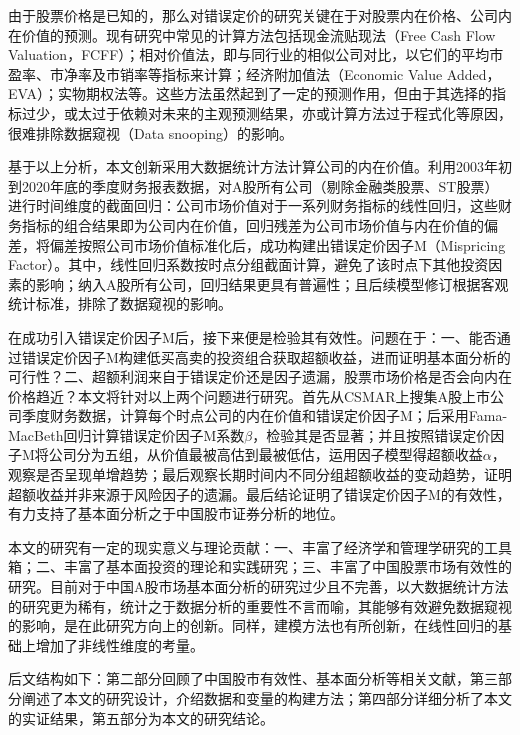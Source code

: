 由于股票价格是已知的，那么对错误定价的研究关键在于对股票内在价格、公司内在价值的预测。现有研究中常见的计算方法包括现金流贴现法（Free Cash Flow Valuation，FCFF）；相对价值法，即与同行业的相似公司对比，以它们的平均市盈率、市净率及市销率等指标来计算；经济附加值法（Economic Value Added，EVA）；实物期权法等。这些方法虽然起到了一定的预测作用，但由于其选择的指标过少，或太过于依赖对未来的主观预测结果，亦或计算方法过于程式化等原因，很难排除数据窥视（Data snooping）的影响。

基于以上分析，本文创新采用大数据统计方法计算公司的内在价值。利用2003年初到2020年底的季度财务报表数据，对A股所有公司（剔除金融类股票、ST股票）进行时间维度的截面回归：公司市场价值对于一系列财务指标的线性回归，这些财务指标的组合结果即为公司内在价值，回归残差为公司市场价值与内在价值的偏差，将偏差按照公司市场价值标准化后，成功构建出错误定价因子M（Mispricing Factor）。其中，线性回归系数按时点分组截面计算，避免了该时点下其他投资因素的影响；纳入A股所有公司，回归结果更具有普遍性；且后续模型修订根据客观统计标准，排除了数据窥视的影响。

在成功引入错误定价因子M后，接下来便是检验其有效性。问题在于：一、能否通过错误定价因子M构建低买高卖的投资组合获取超额收益，进而证明基本面分析的可行性？二、超额利润来自于错误定价还是因子遗漏，股票市场价格是否会向内在价格趋近？本文将针对以上两个问题进行研究。首先从CSMAR上搜集A股上市公司季度财务数据，计算每个时点公司的内在价值和错误定价因子M；后采用Fama-MacBeth回归计算错误定价因子M系数$\beta$，检验其是否显著；并且按照错误定价因子M将公司分为五组，从价值最被高估到最被低估，运用因子模型得超额收益$\alpha$，观察是否呈现单增趋势；最后观察长期时间内不同分组超额收益的变动趋势，证明超额收益并非来源于风险因子的遗漏。最后结论证明了错误定价因子M的有效性，有力支持了基本面分析之于中国股市证券分析的地位。

本文的研究有一定的现实意义与理论贡献：一、丰富了经济学和管理学研究的工具箱；二、丰富了基本面投资的理论和实践研究；三、丰富了中国股票市场有效性的研究。目前对于中国A股市场基本面分析的研究过少且不完善，以大数据统计方法的研究更为稀有，统计之于数据分析的重要性不言而喻，其能够有效避免数据窥视的影响，是在此研究方向上的创新。同样，建模方法也有所创新，在线性回归的基础上增加了非线性维度的考量。

后文结构如下：第二部分回顾了中国股市有效性、基本面分析等相关文献，第三部分阐述了本文的研究设计，介绍数据和变量的构建方法；第四部分详细分析了本文的实证结果，第五部分为本文的研究结论。
